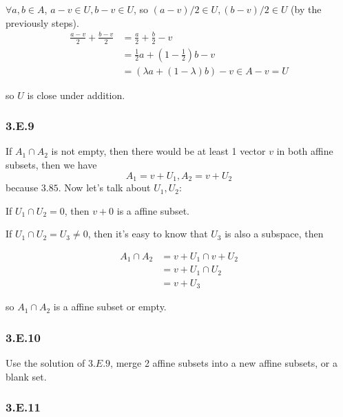 $\forall a, b \in A$, $a-v \in U, b-v\in U$, so $(a-v)/2 \in U, (b-v)/2 \in U$ (by the previously steps).
\begin{equation*}
    \begin{split}
    \frac{a-v}{2} + \frac{b-v}{2} &= \frac{a}{2} + \frac{b}{2} - v \\
    &= \frac{1}{2}a + (1-\frac{1}{2})b -v \\
    &= (\lambda a + (1-\lambda)b) -v \in {A-v} = U
    \end{split}
\end{equation*}

so $U$ is close under addition.

\subsubsection*{3.E.9}

If $A_{1} \cap A_{2} $ is not empty, then there would be at least 1 vector $v$ in both affine subsets, then we have
\[A_{1} = v + U_{1}, A_{2} = v + U_{2}\] 
because $3.85$. Now let's talk about $U_{1}, U_{2}$: 

If $U_{1} \cap U_{2} = {0}$, then $v + {0}$ is a affine subset.

If $U_{1} \cap U_{2} = U_{3} \neq {0}$, then it's easy to know that $U_{3}$ is also a subspace, then

\begin{equation*}
    \begin{split}
    A_{1} \cap A_{2} &= {v + U_{1}} \cap {v + U_{2}} \\
    &= {v + U_{1}\cap U_{2}} \\
    &= {v + U_{3}}
        \end{split}
\end{equation*}

so $A_{1} \cap A_{2} $ is a affine subset or empty.

\subsubsection*{3.E.10}

Use the solution of $3.E.9$, merge 2 affine subsets into a new affine subsets, or a blank set. 

\subsubsection*{3.E.11}

